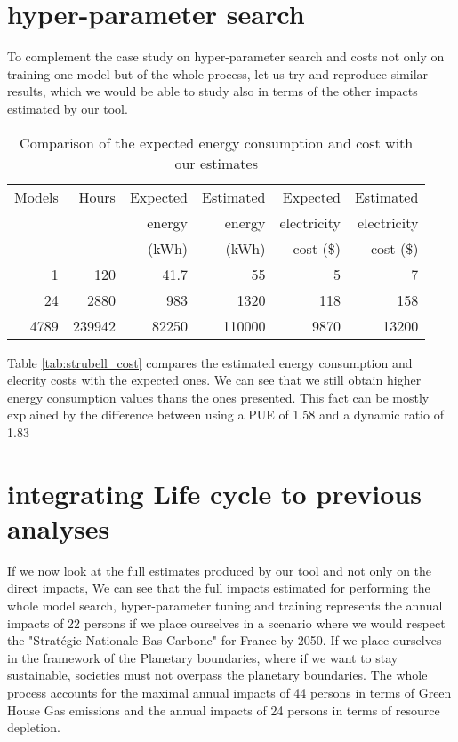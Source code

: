 \documentclass[11pt]{article}
\begin{document}
\section{hyper-parameter search}
\label{sec:org78c3f28}

To complement the case study on hyper-parameter search and costs not
only on training one model but of the whole process, let us try and
reproduce similar results, which we would be able to study also in
terms of the other impacts estimated by our tool.

\begin{table}[htbp]
\caption{Comparison of the expected energy consumption and cost with our estimates}
\centering
\begin{tabular}{rrrrrr}
Models & Hours & Expected & Estimated & Expected & Estimated\\
 &  & energy & energy & electricity & electricity\\
 &  & (kWh) & (kWh) & cost (\$) & cost (\$)\\
\hline
1 & 120 & 41.7 & 55 & 5 & 7\\
24 & 2880 & 983 & 1320 & 118 & 158\\
4789 & 239942 & 82250 & 110000 & 9870 & 13200\\
\end{tabular}
\end{table}

Table \ref{tab:strubell_cost} compares the estimated energy consumption
and elecrity costs with the expected ones. We can see that we still obtain higher energy consumption  values thans
the ones presented. This fact can be mostly explained by the
difference between using a \gls{PUE} of 1.58 and a dynamic ratio of 1.83

\section{integrating Life cycle to previous analyses}
\label{sec:orgc82acf1}

If we now look at the full estimates produced by our tool and not only
on the direct impacts, 
We can see that the full impacts estimated for performing the whole
model search, hyper-parameter tuning and training represents the annual
impacts of 22 persons if we place ourselves in a scenario where we
would respect the "Stratégie Nationale Bas Carbone" for France
by 2050. If we place ourselves in the framework of the Planetary
boundaries, where if we want to stay sustainable, societies must not
overpass the planetary boundaries. The whole process accounts for the
maximal annual impacts of 44 persons in terms of Green House Gas
emissions and the annual impacts of 24 persons in terms of resource
depletion.
\end{document}
